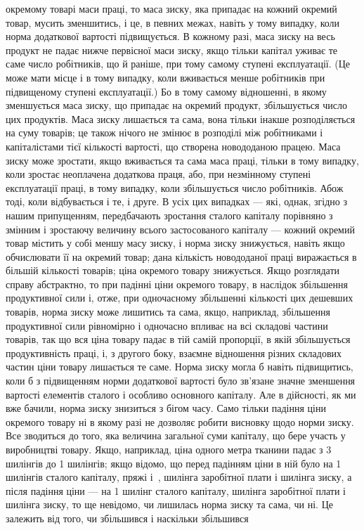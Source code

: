 \parcont{}  %
окремому товарі маси праці, то маса зиску, яка припадає на кожний окремий товар, мусить зменшитись,
і це, в певних межах, навіть у тому випадку, коли норма додаткової вартості підвищується. В кожному
разі, маса зиску на весь продукт не падає нижче первісної маси зиску, якщо тільки капітал уживає те
саме число робітників, що й раніше, при тому самому ступені експлуатації. (Це може мати місце і в
тому випадку, коли вживається менше робітників при підвищеному ступені експлуатації.) Бо в тому
самому відношенні, в якому зменшується маса зиску, що припадає на окремий продукт, збільшується
число цих продуктів. Маса зиску лишається та сама, вона тільки інакше розподіляється на суму
товарів; це також нічого не змінює в розподілі між робітниками і капіталістами тієї кількості
вартості, що створена новододаною працею. Маса зиску може зростати, якщо вживається та сама маса
праці, тільки в тому випадку, коли зростає неоплачена додаткова праця, або, при незмінному ступені
експлуатації праці, в тому випадку, коли збільшується число робітників. Абож тоді, коли відбувається
і те, і друге. В усіх цих випадках — які, однак, згідно з нашим припущенням, передбачають зростання
сталого капіталу порівняно з змінним і зростаючу величину всього застосованого капіталу — кожний
окремий товар містить у собі меншу масу зиску, і норма зиску знижується, навіть якщо обчислювати її
на окремий товар; дана кількість новододаної праці виражається в більшій кількості товарів; ціна
окремого товару знижується. Якщо
розглядати справу абстрактно, то при падінні ціни окремого товару, в наслідок збільшення
продуктивної сили і, отже, при одночасному збільшенні кількості цих дешевших товарів, норма зиску
може лишитись та сама, якщо, наприклад, збільшення продуктивної сили рівномірно і одночасно впливає
на всі складові частини товарів, так що вся ціна товару падає в тій самій пропорції, в якій
збільшується продуктивність праці, і, з другого боку, взаємне відношення різних складових частин
ціни товару лишається те саме. Норма зиску могла б навіть підвищитись, коли б з підвищенням норми
додаткової вартості було зв’язане значне зменшення вартості елементів сталого і особливо основного
капіталу. Але в дійсності, як ми вже бачили, норма зиску знизиться з бігом часу. Само тільки падіння
ціни окремого товару ні в якому разі не дозволяє робити висновку щодо норми зиску. Все зводиться до
того, яка величина загальної суми капіталу, що бере участь у виробництві товару. Якщо, наприклад,
ціна одного метра тканини падає з 3 шилінгів до 1  шилінгів; якщо відомо, що перед падінням ціни
в ній було на 1  шилінгів сталого капіталу, пряжі і~,   шилінга заробітної плати і 
шилінга зиску, а після падіння ціни — на 1 шилінг сталого капіталу,   шилінга заробітної плати і
  шилінга зиску, то ще невідомо, чи лишилась норма зиску та сама, чи ні. Це залежить від того, чи
збільшився і наскільки збільшився
\parbreak{}  %
